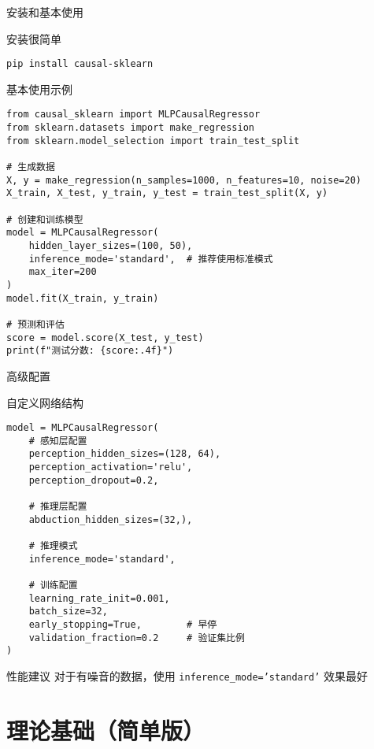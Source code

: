 \documentclass[aspectratio=169,12pt]{beamer}
\begin{document}
\begin{frame}[fragile]{安装和基本使用}
\begin{block}{安装很简单}
\begin{lstlisting}
pip install causal-sklearn
\end{lstlisting}
\end{block}

\begin{block}{基本使用示例}
\begin{lstlisting}
from causal_sklearn import MLPCausalRegressor
from sklearn.datasets import make_regression
from sklearn.model_selection import train_test_split

# 生成数据
X, y = make_regression(n_samples=1000, n_features=10, noise=20)
X_train, X_test, y_train, y_test = train_test_split(X, y)

# 创建和训练模型
model = MLPCausalRegressor(
    hidden_layer_sizes=(100, 50),
    inference_mode='standard',  # 推荐使用标准模式
    max_iter=200
)
model.fit(X_train, y_train)

# 预测和评估
score = model.score(X_test, y_test)
print(f"测试分数: {score:.4f}")
\end{lstlisting}
\end{block}
\end{frame}

\begin{frame}[fragile]{高级配置}
\begin{block}{自定义网络结构}
\begin{lstlisting}
model = MLPCausalRegressor(
    # 感知层配置
    perception_hidden_sizes=(128, 64),
    perception_activation='relu',
    perception_dropout=0.2,
    
    # 推理层配置
    abduction_hidden_sizes=(32,),
    
    # 推理模式
    inference_mode='standard',
    
    # 训练配置
    learning_rate_init=0.001,
    batch_size=32,
    early_stopping=True,        # 早停
    validation_fraction=0.2     # 验证集比例
)
\end{lstlisting}
\end{block}

\begin{alertblock}{性能建议}
对于有噪音的数据，使用 \texttt{inference\_mode='standard'} 效果最好
\end{alertblock}
\end{frame}

\section{理论基础（简单版）}
\end{document}

